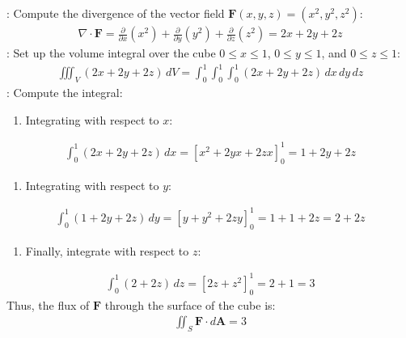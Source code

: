 \documentclass[letterpaper,10pt,english]{jupyterBook}
\begin{document}
\sphinxAtStartPar
{}: Compute the divergence of the vector field \( \mathbf{F}(x, y, z) = (x^2, y^2, z^2) \):
\begin{equation*}
\begin{split}
\nabla \cdot \mathbf{F} = \frac{\partial}{\partial x}(x^2) + \frac{\partial}{\partial y}(y^2) + \frac{\partial}{\partial z}(z^2) = 2x + 2y + 2z
\end{split}
\end{equation*}
\sphinxAtStartPar
{}: Set up the volume integral over the cube \( 0 \leq x \leq 1 \), \( 0 \leq y \leq 1 \), and \( 0 \leq z \leq 1 \):
\begin{equation*}
\begin{split}
\iiint_V (2x + 2y + 2z) \, dV = \int_0^1 \int_0^1 \int_0^1 (2x + 2y + 2z) \, dx \, dy \, dz
\end{split}
\end{equation*}
\sphinxAtStartPar
{}: Compute the integral:
\begin{enumerate}
%
\item {} 
\sphinxAtStartPar
Integrating with respect to \( x \):

\end{enumerate}
\begin{equation*}
\begin{split}
\int_0^1 (2x + 2y + 2z) \, dx = \left[ x^2 + 2yx + 2zx \right]_0^1 = 1 + 2y + 2z
\end{split}
\end{equation*}\begin{enumerate}
%
\setcounter{enumi}{1}
\item {} 
\sphinxAtStartPar
Integrating with respect to \( y \):

\end{enumerate}
\begin{equation*}
\begin{split}
\int_0^1 (1 + 2y + 2z) \, dy = \left[ y + y^2 + 2zy \right]_0^1 = 1 + 1 + 2z = 2 + 2z
\end{split}
\end{equation*}\begin{enumerate}
%
\setcounter{enumi}{2}
\item {} 
\sphinxAtStartPar
Finally, integrate with respect to \( z \):

\end{enumerate}
\begin{equation*}
\begin{split}
\int_0^1 (2 + 2z) \, dz = \left[ 2z + z^2 \right]_0^1 = 2 + 1 = 3
\end{split}
\end{equation*}
\sphinxAtStartPar
Thus, the flux of \( \mathbf{F} \) through the surface of the cube is:
\begin{equation*}
\begin{split}
\iint_S \mathbf{F} \cdot d\mathbf{A} = 3
\end{split}
\end{equation*}
\end{document}
